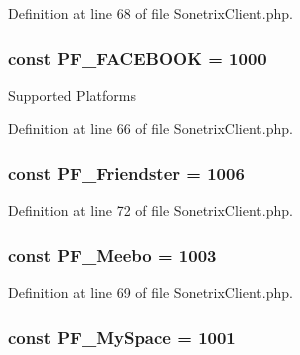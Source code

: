 Definition at line 68 of file SonetrixClient.php.

\hypertarget{classSonetrixClient_a4ac3e460ee02ac10bfb658decf181af2}{
\subsubsection[{PF\_\-FACEBOOK}]{\setlength{\rightskip}{0pt plus 5cm}const {\bf PF\_\-FACEBOOK} = 1000}}
\label{classSonetrixClient_a4ac3e460ee02ac10bfb658decf181af2}
Supported Platforms 

Definition at line 66 of file SonetrixClient.php.

\hypertarget{classSonetrixClient_a41bdcc39f5464386850c0a59e2e488da}{
\subsubsection[{PF\_\-Friendster}]{\setlength{\rightskip}{0pt plus 5cm}const {\bf PF\_\-Friendster} = 1006}}
\label{classSonetrixClient_a41bdcc39f5464386850c0a59e2e488da}


Definition at line 72 of file SonetrixClient.php.

\hypertarget{classSonetrixClient_ad2891ce22c2e75ada4a612cf8fff5685}{
\subsubsection[{PF\_\-Meebo}]{\setlength{\rightskip}{0pt plus 5cm}const {\bf PF\_\-Meebo} = 1003}}
\label{classSonetrixClient_ad2891ce22c2e75ada4a612cf8fff5685}


Definition at line 69 of file SonetrixClient.php.

\hypertarget{classSonetrixClient_a502e2dfe7e28c0a91549444f1f4a6abe}{
\subsubsection[{PF\_\-MySpace}]{\setlength{\rightskip}{0pt plus 5cm}const {\bf PF\_\-MySpace} = 1001}}
\label{classSonetrixClient_a502e2dfe7e28c0a91549444f1f4a6abe}


